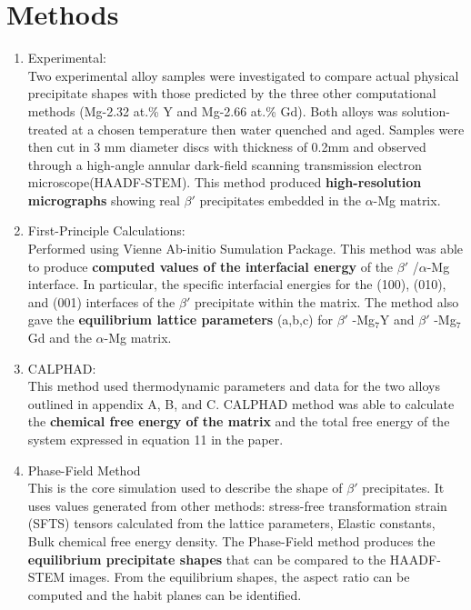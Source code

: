 \documentclass[11pt]{article}
\newcommand{\bprime} {$\beta'$ }
\begin{document}
\section*{Methods}
\begin{enumerate}
    \item Experimental:
    \\
    Two experimental alloy samples were investigated to compare actual physical precipitate shapes with those predicted by
    the three other computational methods (Mg-2.32 at.\% Y and Mg-2.66 at.\% Gd). Both alloys was solution-treated at a chosen temperature then 
    water quenched and aged. Samples were then cut in 3 mm diameter discs with thickness of 0.2mm and observed through a 
    high-angle annular dark-field scanning transmission electron microscope(HAADF-STEM).
    This method produced \textbf{high-resolution micrographs} showing real \bprime precipitates embedded in the $\alpha$-Mg matrix.
    \item First-Principle Calculations:
    \\
    Performed using Vienne Ab-initio Sumulation Package. 
    This method was able to produce \textbf{computed values of the interfacial energy} of the \bprime/$\alpha$-Mg interface. In particular, the specific interfacial energies for the (100), (010), and (001) interfaces of the \bprime precipitate within the matrix.
    The method also gave the \textbf{equilibrium lattice parameters} (a,b,c) for \bprime-Mg$_7$Y and \bprime-Mg$_7$Gd and the $\alpha$-Mg matrix.
    \item CALPHAD:
    \\
    This method used thermodynamic parameters and data for the two alloys outlined in appendix A, B, and C.
    CALPHAD method was able to calculate the \textbf{chemical free energy of the matrix} and the total free energy of the system expressed in equation 11 in the paper.
    \item Phase-Field Method
    \\
    This is the core simulation used to describe the shape of \bprime precipitates. 
    It uses values generated from other methods: stress-free transformation strain (SFTS) tensors calculated from the lattice parameters, 
    Elastic constants, Bulk chemical free energy density.
    The Phase-Field method produces the \textbf{equilibrium precipitate shapes} that can be compared to the HAADF-STEM images. 
    From the equilibrium shapes, the aspect ratio can be computed and the habit planes can be identified. 
\end{enumerate}
\end{document}
